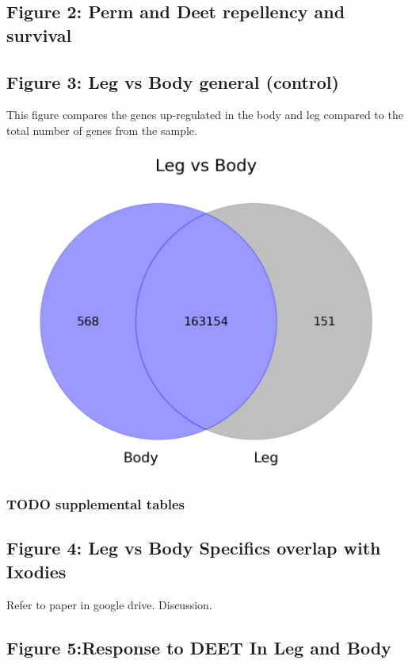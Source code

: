 \documentclass[11pt]{article}
\begin{document}
\subsection{Figure 2: Perm and Deet repellency and survival}
\label{sec:org5e9c6e4}
\subsection{Figure 3: Leg vs Body general (control)}
\label{sec:orgcc87d3d}
This figure compares the genes up-regulated in the body and leg compared to the total number of genes from the sample.
\begin{center}
\includegraphics[width=.9\linewidth]{figure3/Deseq-BodyvsLeg.png}
\end{center}
\subsubsection{{\bfseries\sffamily TODO} supplemental tables}
\label{sec:orgd4fd707}
\subsection{Figure 4: Leg vs Body Specifics overlap with Ixodies}
\label{sec:org8ef8d3e}
Refer to paper in google drive. Discussion.
\subsection{Figure 5:Response to DEET In Leg and Body}
\label{sec:orgbe7f4d3}
\end{document}
